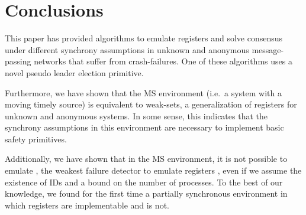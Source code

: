 \documentclass[conference, compsoc]{IEEEtran}
\begin{document}
\section{Conclusions}

This paper has provided algorithms to emulate registers and solve consensus under different synchrony assumptions in unknown and anonymous message-passing networks that suffer from crash-failures. One of these algorithms uses a novel pseudo leader election primitive. 



Furthermore, we have shown that the MS environment (i.e.~a system with a moving timely source) is equivalent to weak-sets, a generalization of registers for unknown and anonymous systems. In some sense, this indicates that the synchrony assumptions in this environment are necessary to implement basic safety primitives.

Additionally, we have shown that in the MS environment, it is not possible to emulate , the weakest failure detector to emulate registers \cite{200377/IC}, even if we assume the existence of IDs and a bound on the number of processes. 
To the best of our knowledge, we found for the first time a partially synchronous environment in which registers are implementable and  is not.








\end{document}
